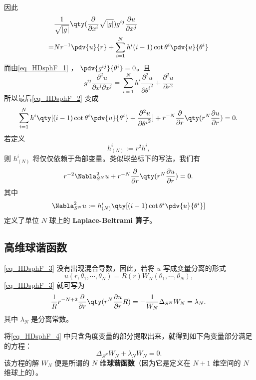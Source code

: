 因此
\begin{equation}
\begin{aligned}
&\frac{1}{\sqrt{ \left\lvert g \right\rvert }} \qty(\frac{\partial }{\partial x^i} \sqrt{ \left\lvert g \right\rvert })g^{ij} \frac{\partial u}{\partial x^j}\\
=&Nr^{-1}\pdv{u}{r}+\sum_{i=1}^{N}h^{i}(i-1)\cot\theta^i\pdv{u}{\theta^i}\\
\end{aligned}~
\end{equation}
而由\autoref{eq_HDsphF_1} ， $\pdv{g^{ij}}{\theta^i}=0$。且
\begin{equation}
g^{ij}\frac{\partial^2 u}{\partial x^i\partial x^j}=\sum_{i=1}^{N}h^{i}\frac{\partial^2 u}{\partial {\theta^i}^2}+\frac{\partial^2 u}{\partial r^2}~
\end{equation}
所以最后\autoref{eq_HDsphF_2} 变成
\begin{equation}
\begin{aligned}
\sum_{i=1}^{N}h^{i}\qty[(i-1)\cot\theta^i\pdv{u}{\theta^i}+\frac{\partial^2 u}{\partial {\theta^i}^2}]+r^{-N}\frac{\partial }{\partial r}\qty(r^{N}\frac{\partial u}{\partial r})=0.
\end{aligned}~
\end{equation}
若定义 
\begin{equation}
h^i_{(N)}:=r^2h^i,~
\end{equation}
则 $h^i_{(N)}$ 将仅仅依赖于角部变量。类似球坐标下的写法，我们有
\begin{equation}\label{eq_HDsphF_3}
r^{-2}\Nabla^{2}_{S^N}u+r^{-N}\frac{\partial }{\partial r}\qty(r^{N}\frac{\partial u}{\partial r})=0.~
\end{equation}
其中
\begin{equation}
\Nabla^{2}_{S^N}u:=h^{i}_{(N)}\qty[(i-1)\cot\theta^i\pdv{u}{\theta^i}]~
\end{equation}
定义了单位 $N$ 球上的 \textbf{Laplace-Beltrami 算子}。
\subsection{高维球谐函数}
\autoref{eq_HDsphF_3} 没有出现混合导数，因此，若将 $u$ 写成变量分离的形式
\begin{equation}
u(r,\theta_1,\cdots,\theta_N)=R(r)W_N(\theta_1,\cdots,\theta_N),~
\end{equation}
\autoref{eq_HDsphF_3} 就可写为
\begin{equation}\label{eq_HDsphF_4}
\frac{1}{R}r^{-N+2}\frac{\partial }{\partial r}\qty(r^{N}\frac{\partial u}{\partial r}R)=-\frac{1}{W_N}\Delta_{S^N}W_N=\lambda_N.~
\end{equation}
其中 $\lambda_N$ 是分离常数。

将\autoref{eq_HDsphF_4} 中只含角度变量的部分提取出来，就得到如下角变量部分满足的方程：
\begin{equation}
\Delta_{S^N}W_N+\lambda_N W_N=0.~
\end{equation}
该方程的解 $W_N$ 便是所谓的 $N$ 维\textbf{球谐函数}（因为它是定义在 $N+1$ 维空间的 $N$ 维球上的）。







